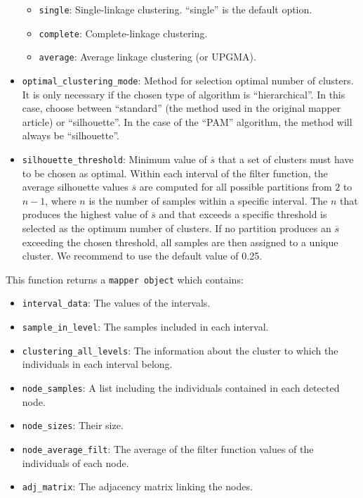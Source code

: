 \begin{itemize}
  \begin{itemize}
  \tightlist
  \item
    \texttt{single}: Single-linkage clustering. ``single'' is the default option.
  \item
    \texttt{complete}: Complete-linkage clustering.
  \item
    \texttt{average}: Average linkage clustering (or UPGMA).
  \end{itemize}
\item
  \texttt{optimal\_clustering\_mode}: Method for selection optimal number of clusters. It is only necessary if the chosen type of algorithm is ``hierarchical''. In this case, choose between ``standard'' (the method used in the original mapper article) or ``silhouette''. In the case of the ``PAM'' algorithm, the method will always be ``silhouette''.
\item
  \texttt{silhouette\_threshold}: Minimum value of \(\overline{s}\) that a set of clusters must have to be chosen as optimal. Within each interval of the filter function, the average silhouette values \(\overline{s}\) are computed for all possible partitions from \(2\) to \(n-1\), where \(n\) is the number of samples within a specific interval. The \(n\) that produces the highest value of \(\overline{s}\) and that exceeds a specific threshold is selected as the optimum number of clusters. If no partition produces an \(\overline{s}\) exceeding the chosen threshold, all samples are then assigned to a unique cluster. We recommend to use the default value of 0.25.
\end{itemize}

This function returns a \texttt{mapper\ object} which contains:

\begin{itemize}
\tightlist
\item
  \texttt{interval\_data}: The values of the intervals.
\item
  \texttt{sample\_in\_level}: The samples included in each interval.
\item
  \texttt{clustering\_all\_levels}: The information about the cluster to which the individuals in each interval belong.
\item
  \texttt{node\_samples}: A list including the individuals contained in each detected node.
\item
  \texttt{node\_sizes}: Their size.
\item
  \texttt{node\_average\_filt}: The average of the filter function values of the individuals of each node.
\item
  \texttt{adj\_matrix}: The adjacency matrix linking the nodes.
\end{itemize}

